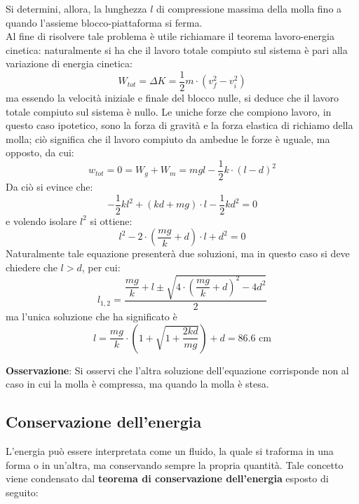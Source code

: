 \documentclass[a4paper]{extarticle}
\begin{document}
\noindent
Si determini, allora, la lunghezza $l$ di compressione massima della molla fino a quando l'assieme blocco-piattaforma si ferma.\\
Al fine di risolvere tale problema è utile richiamare il teorema lavoro-energia cinetica: naturalmente si ha che il lavoro totale compiuto sul sistema è pari alla variazione di energia cinetica:
\[W_{tot} = \Delta K = \frac{1}{2}m \cdot \left(v_f^2 - v_i^2\right)\]
ma essendo la velocità iniziale e finale del blocco nulle, si deduce che il lavoro totale compiuto sul sistema è nullo. Le uniche forze che compiono lavoro, in questo caso ipotetico, sono la forza di gravità e la forza elastica di richiamo della molla; ciò significa che il lavoro compiuto da ambedue le forze è uguale, ma opposto, da cui:
\[w_{tot}=0=W_g+W_m=mgl-\frac{1}{2}k \cdot (l-d)^2\]
Da ciò si evince che:
\[-\frac{1}{2}kl^2 + (kd+mg) \cdot l - \frac{1}{2}kd^2=0\]
e volendo isolare $l^2$ si ottiene:
\[l^2 - 2 \cdot \left(\frac{mg}{k} + d\right) \cdot l + d^2=0\]
Naturalmente tale equazione presenterà due soluzioni, ma in questo caso si deve chiedere che $l>d$, per cui:
\[l_{1,2}=\frac{\dfrac{mg}{k}+l \pm \sqrt{4 \cdot \left(\dfrac{mg}{k} + d\right)^2 - 4d^2}}{2}\]
ma l'unica soluzione che ha significato è
\[l = \frac{mg}{k} \cdot \left(1+\sqrt{1+\frac{2kd}{mg}}\right)+d = 86.6 \text{ cm}\]

\vspace{1em}
\noindent
\textbf{Osservazione}: Si osservi che l'altra soluzione dell'equazione corrisponde non al caso in cui la molla è compressa, ma quando la molla è stesa.

\newpage
\noindent
\subsection{Conservazione dell'energia}
L'energia può essere interpretata come un fluido, la quale si traforma in una forma o in un'altra, ma conservando sempre la propria quantità. Tale concetto viene condensato dal \textbf{teorema di conservazione dell'energia} esposto di seguito:
\end{document}
